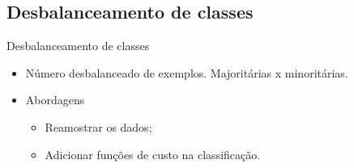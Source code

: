 \documentclass{beamer}
\begin{document}
\subsection{Desbalanceamento de classes}
\begin{frame}{Desbalanceamento de classes}
\begin{itemize}
  \item Número desbalanceado de exemplos. Majoritárias x minoritárias.
  \item Abordagens
    \begin{itemize}
        \item Reamostrar os dados;
        \item Adicionar funções de custo na classificação.
    \end{itemize}
\end{itemize}



\end{frame}
\end{document}
